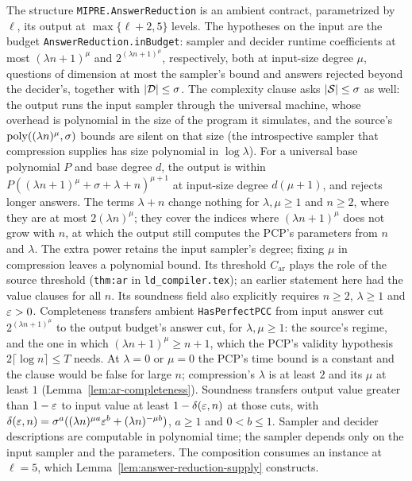 \begin{definition}
\label{def:answer-reduction-contract}
\leanok
The structure \texttt{MIPRE.AnswerReduction} is an ambient contract,
parametrized by $\ell$, its output at $\max\{\ell + 2, 5\}$ levels. The hypotheses on the
input are the budget \texttt{AnswerReduction.inBudget}: sampler and decider runtime
coefficients at most $(\lambda n + 1)^\mu$ and $2^{(\lambda n + 1)^\mu}$, respectively,
both at input-size degree $\mu$, questions of dimension at most
the sampler's bound and answers rejected beyond the decider's, together with $\left\vert {\mathcal{D}} \right\vert
\leq \sigma$. The complexity clause asks $\left\vert {\mathcal{S}} \right\vert \leq \sigma$ as well: the output
runs the input sampler through the universal machine, whose overhead is polynomial in the
size of the program it simulates, and the source's $\mathrm{poly}((\lambda n)^\mu, \sigma)$ bounds
are silent on that size (the introspective sampler that compression supplies has size
polynomial in $\log \lambda$). For a universal base polynomial $P$ and base degree $d$, the
output is within $P((\lambda n+1)^\mu+\sigma+\lambda+n)^{\mu+1}$ at input-size degree
$d(\mu+1)$, and rejects longer answers. The terms $\lambda+n$ change nothing for $\lambda,\mu\geq1$
and $n\geq2$, where they are at most $2(\lambda n)^\mu$; they cover the indices where
$(\lambda n+1)^\mu$ does not grow with $n$, at which the output still computes the PCP's
parameters from $n$ and $\lambda$. The extra power retains the input
sampler's degree; fixing $\mu$ in compression leaves a polynomial bound. Its threshold $C_{\mathrm{ar}}$
plays the role of the source threshold (\texttt{thm:ar} in \texttt{ld\_compiler.tex}); an earlier statement here had the
value clauses for all $n$. Its soundness field also explicitly requires $n\geq2$,
$\lambda\geq1$ and $\varepsilon>0$. Completeness transfers ambient \texttt{HasPerfectPCC}
from input answer cut $2^{(\lambda n+1)^\mu}$ to the output budget's answer cut, for
$\lambda,\mu\geq1$: the source's regime, and the one in which $(\lambda n+1)^\mu\geq n+1$, which
the PCP's validity hypothesis $2\lceil\log n\rceil\leq T$ needs. At $\lambda=0$ or $\mu=0$ the
PCP's time bound is a constant and the clause would be false for large $n$; compression's
$\lambda$ is at least $2$ and its $\mu$ at least $1$ (Lemma~\ref{lem:ar-completeness}).
Soundness transfers output value greater than $1-\varepsilon$ to input value at least
$1-\delta(\varepsilon,n)$ at those cuts, with
$\delta(\varepsilon,n)=\sigma^a((\lambda n)^{\mu a}\varepsilon^b+(\lambda n)^{-\mu b})$,
$a\geq1$ and $0<b\leq1$. Sampler and decider descriptions are computable in
polynomial time; the sampler depends only on the input sampler and the parameters.
The composition consumes an instance at $\ell=5$, which
Lemma~\ref{lem:answer-reduction-supply} constructs.
\end{definition}

